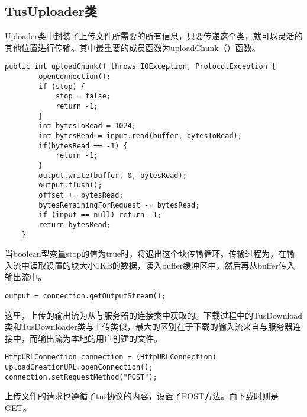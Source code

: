 \documentclass[bachelor]{thesis-uestc}
\begin{document}
\subsection{TusUploader类}
Uploader类中封装了上传文件所需要的所有信息，只要传递这个类，就可以灵活的其他位置进行传输。其中最重要的成员函数为uploadChunk（）函数。
\begin{lstlisting}[title=上传函数]
public int uploadChunk() throws IOException, ProtocolException {
        openConnection();
        if (stop) {
    		stop = false;
    		return -1;
    	}
        int bytesToRead = 1024;
        int bytesRead = input.read(buffer, bytesToRead);
        if(bytesRead == -1) {
        	return -1;
        }
        output.write(buffer, 0, bytesRead);
        output.flush();
        offset += bytesRead;
        bytesRemainingForRequest -= bytesRead;
        if (input == null) return -1;
        return bytesRead;
    }
\end{lstlisting}
\par 当boolean型变量stop的值为true时，将退出这个块传输循环。传输过程为，在输入流中读取设置的块大小1KB的数据，读入buffer缓冲区中，然后再从buffer传入输出流中。
\begin{lstlisting}[title=从连接中获取输出流]
output = connection.getOutputStream();
\end{lstlisting}
这里，上传的输出流为从与服务器的连接类中获取的。下载过程中的TusDownload类和TusDownloader类与上传类似，最大的区别在于下载的输入流来自与服务器连接中，而输出流为本地的用户创建的文件。
\begin{lstlisting}[title=tus协议中的新建上传POST]
HttpURLConnection connection = (HttpURLConnection) uploadCreationURL.openConnection();
connection.setRequestMethod("POST");
\end{lstlisting}
\par 上传文件的请求也遵循了tus协议的内容，设置了POST方法。而下载时则是GET。
\end{document}
